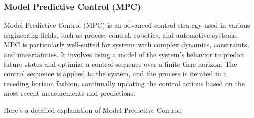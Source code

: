 \subsubsection{Model Predictive Control (MPC)}
Model Predictive Control (MPC) is an advanced control strategy used in various engineering fields, such as process control, robotics, and automotive systems. MPC is particularly well-suited for systems with complex dynamics, constraints, and uncertainties. It involves using a model of the system's behavior to predict future states and optimize a control sequence over a finite time horizon. The control sequence is applied to the system, and the process is iterated in a receding horizon fashion, continually updating the control actions based on the most recent measurements and predictions.

Here's a detailed explanation of Model Predictive Control:
